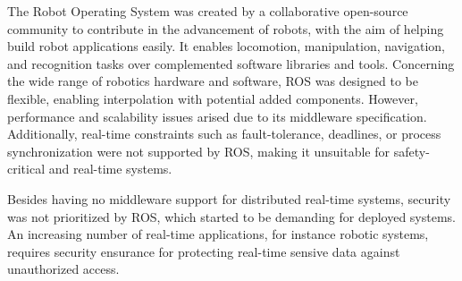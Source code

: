
The Robot Operating System was created by a collaborative open-source community to contribute in the advancement of robots, with the aim of helping build robot applications easily. \cite{diluoffo2018robot} It enables locomotion, manipulation, navigation, and recognition tasks over complemented software libraries and tools. Concerning the wide range of robotics hardware and software, ROS was designed to be flexible, enabling interpolation with potential added components. However, performance and scalability issues arised due to its middleware specification. \cite{intro-ros} Additionally, real-time constraints such as fault-tolerance, deadlines, or process synchronization were not supported by ROS, making it unsuitable for safety-critical and real-time systems. \cite{kim2018security} 

Besides having no middleware support for distributed real-time systems, security was not prioritized by ROS, which started to be demanding for deployed systems. An increasing number of real-time applications, for instance robotic systems, requires security ensurance for protecting real-time sensive data against unauthorized access. \cite{lin2009static} 

